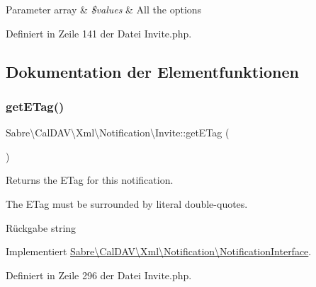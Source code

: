 \begin{DoxyParams}[1]{Parameter}
array & {\em \$values} & All the options \\
\hline
\end{DoxyParams}


Definiert in Zeile 141 der Datei Invite.\+php.



\subsection{Dokumentation der Elementfunktionen}
\mbox{\label{class_sabre_1_1_cal_d_a_v_1_1_xml_1_1_notification_1_1_invite_a8d56779d8f2e8657cc7d5f1cd49af29e}} 
\subsubsection{\texorpdfstring{get\+E\+Tag()}{getETag()}}
{\footnotesize\ttfamily Sabre\textbackslash{}\+Cal\+D\+A\+V\textbackslash{}\+Xml\textbackslash{}\+Notification\textbackslash{}\+Invite\+::get\+E\+Tag (\begin{DoxyParamCaption}{ }\end{DoxyParamCaption})}

Returns the E\+Tag for this notification.

The E\+Tag must be surrounded by literal double-\/quotes.

\begin{DoxyReturn}{Rückgabe}
string 
\end{DoxyReturn}


Implementiert \mbox{\hyperlink{interface_sabre_1_1_cal_d_a_v_1_1_xml_1_1_notification_1_1_notification_interface_a5f87e03e47df0de258d637209fc906be}{Sabre\textbackslash{}\+Cal\+D\+A\+V\textbackslash{}\+Xml\textbackslash{}\+Notification\textbackslash{}\+Notification\+Interface}}.



Definiert in Zeile 296 der Datei Invite.\+php.

\mbox{\label{class_sabre_1_1_cal_d_a_v_1_1_xml_1_1_notification_1_1_invite_a40a0865508bb7f508f3938a4ac799dc3}} 

